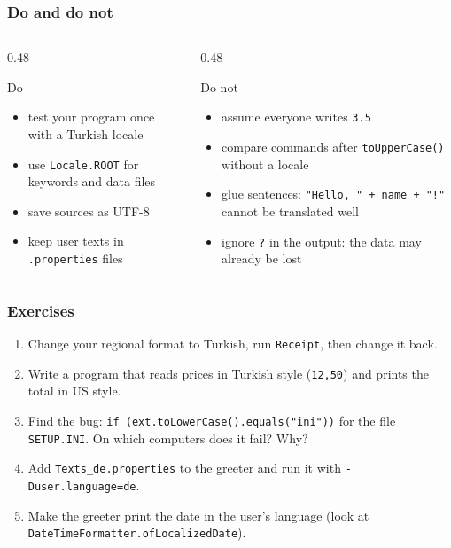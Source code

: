 \documentclass[aspectratio=169,10pt,compress]{beamer}
\begin{document}
\begin{frame}[t,fragile] \frametitle{Do and do not}
  \begin{columns}[T]
    \begin{column}{0.48\textwidth}
      \begin{block}{Do}
        \small
        \begin{itemize}
          \item test your program once with a Turkish locale
          \item use \texttt{Locale.ROOT} for keywords and data files
          \item save sources as UTF-8
          \item keep user texts in \texttt{.properties} files
        \end{itemize}
      \end{block}
    \end{column}
    \begin{column}{0.48\textwidth}
      \begin{alertblock}{Do not}
        \small
        \begin{itemize}
          \item assume everyone writes \texttt{3.5}
          \item compare commands after \texttt{toUpperCase()} without a locale
          \item glue sentences: \texttt{"Hello, " + name + "!"} cannot be translated well
          \item ignore \texttt{?} in the output: the data may already be lost
        \end{itemize}
      \end{alertblock}
    \end{column}
  \end{columns}
\end{frame}




\begin{frame}[t,fragile] \frametitle{Exercises}
  \begin{enumerate}\small
    \item Change your regional format to Turkish, run \texttt{Receipt}, then change it back.
    \item Write a program that reads prices in Turkish style (\texttt{12,50}) and prints the total in US style.
    \item Find the bug: \texttt{if (ext.toLowerCase().equals("ini"))} for the file \texttt{SETUP.INI}. On which computers does it fail? Why?
    \item Add \texttt{Texts\_de.properties} to the greeter and run it with \texttt{-Duser.language=de}.
    \item Make the greeter print the date in the user's language (look at \texttt{DateTimeFormatter.ofLocalizedDate}).
  \end{enumerate}
\end{frame}
\end{document}

